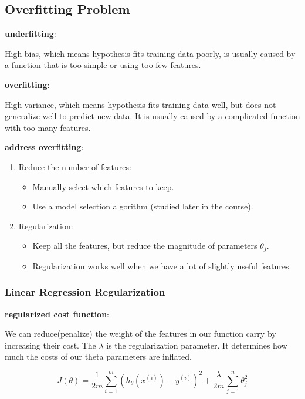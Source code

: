 \documentclass{article}
\begin{document}
\subsection{Overfitting Problem}

\noindent \textbf{underfitting}:

\noindent High bias, which means hypothesis fits training data poorly, is usually caused by a function that is too simple or using too few features. 

\bigskip

\noindent \textbf{overfitting}:

\noindent High variance, which means hypothesis fits training data well, but does not generalize well to predict new data. It is usually caused by a complicated function with too many features.

\bigskip

\noindent \textbf{address overfitting}:

\begin{enumerate}
\item Reduce the number of features:
\begin{itemize}
\item Manually select which features to keep.
\item Use a model selection algorithm (studied later in the course).
\end{itemize}
\item Regularization:
\begin{itemize}
\item Keep all the features, but reduce the magnitude of parameters \(\theta_j\).
\item Regularization works well when we have a lot of slightly useful features.
\end{itemize}
\end{enumerate}

\subsubsection{Linear Regression Regularization}

\noindent \textbf{regularized cost function}:

\noindent We can reduce(penalize) the weight of the features in our function carry by increasing their cost. The \(\lambda\) is the regularization parameter. It determines how much the costs of our theta parameters are inflated. 

\[J(\theta) = \frac{1}{2m} \sum_{i = 1}^m (h_{\theta}(x^{(i)}) - y^{(i)})^2 + \frac{\lambda}{2m} \sum_{j = 1}^n \theta_j^2\]
\end{document}
